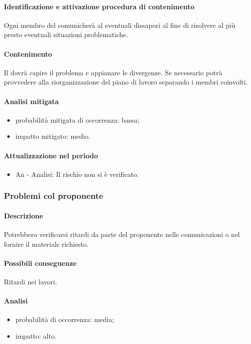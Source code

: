			\paragraph{Identificazione e attivazione procedura di contenimento}
			Ogni membro del  comunicherà al \responsabilediprogetto{} eventuali dissapori al fine di risolvere al più presto eventuali situazioni problematiche.
			\paragraph{Contenimento} Il \responsabilediprogetto{} dovrà capire il problema e appianare le divergenze. Se necessario potrà provvedere alla riorganizzazione del piano di lavoro separando i membri coinvolti.
			\paragraph{Analisi mitigata}
			\begin{itemize}
			\item{probabilità mitigata di occorrenza:} bassa;
			\item{impatto mitigato:} medio.
			\end{itemize}
			\paragraph{Attualizzazione nel periodo}
				\begin{itemize}
				\item{An - Analisi}: Il rischio non si è verificato.
				\end{itemize}

		\subsubsection {Problemi col proponente}
		\label{subsec:pbmProponente}
			\paragraph{Descrizione}
			Potrebbero verificarsi ritardi da parte del proponente nelle comunicazioni o nel fornire il materiale richiesto.
			\paragraph{Possibili conseguenze} Ritardi nei lavori.
			\paragraph{Analisi}
			\begin{itemize}
			\item{probabilità di occorrenza:} media;
			\item{impatto:} alto.
			\end{itemize}
